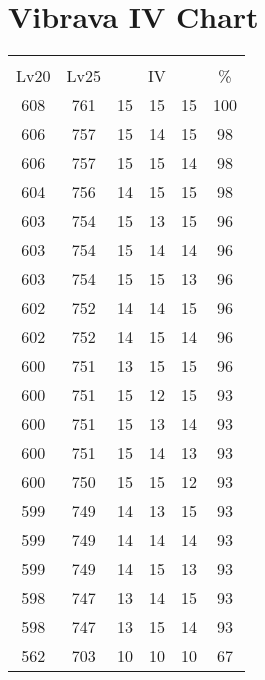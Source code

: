 \documentclass{article}%
\begin{document}
%
\normalsize%
\section{Vibrava IV Chart}%
\label{sec:Vibrava IV Chart}%
\renewcommand{\arraystretch}{1.5}%
\begin{tabular}{|c|c|c|c|c|c|}%
\hline%
\multicolumn{6}{|c|}{\textcolor{white}{ 
\linebreak{Vibrava}
}%
\cellcolor{black}}\\%
\multicolumn{1}{|c}{Lv20}&\multicolumn{1}{c|}{Lv25}&\multicolumn{3}{c|}{IV}&\multicolumn{1}{|c|}{\%}\\%
\hline%
\rowcolor{color100}%
608&761&15&15&15&100\\%
\hline%
\rowcolor{color98}%
606&757&15&14&15&98\\%
\hline%
\rowcolor{color98}%
606&757&15&15&14&98\\%
\hline%
\rowcolor{color98}%
604&756&14&15&15&98\\%
\hline%
\rowcolor{color96}%
603&754&15&13&15&96\\%
\hline%
\rowcolor{color96}%
603&754&15&14&14&96\\%
\hline%
\rowcolor{color96}%
603&754&15&15&13&96\\%
\hline%
\rowcolor{color96}%
602&752&14&14&15&96\\%
\hline%
\rowcolor{color96}%
602&752&14&15&14&96\\%
\hline%
\rowcolor{color96}%
600&751&13&15&15&96\\%
\hline%
\rowcolor{color93}%
600&751&15&12&15&93\\%
\hline%
\rowcolor{color93}%
600&751&15&13&14&93\\%
\hline%
\rowcolor{color93}%
600&751&15&14&13&93\\%
\hline%
\rowcolor{color93}%
600&750&15&15&12&93\\%
\hline%
\rowcolor{color93}%
599&749&14&13&15&93\\%
\hline%
\rowcolor{color93}%
599&749&14&14&14&93\\%
\hline%
\rowcolor{color93}%
599&749&14&15&13&93\\%
\hline%
\rowcolor{color93}%
598&747&13&14&15&93\\%
\hline%
\rowcolor{color93}%
598&747&13&15&14&93\\%
\hline%
\rowcolor{color91}%
562&703&10&10&10&67\\%
\end{tabular}

%
\end{document}
